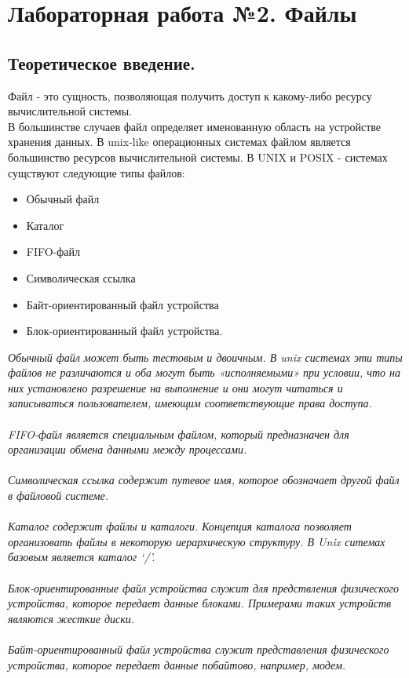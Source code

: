 \documentclass[a4paper]{article}
\begin{document}
\newpage
\section{Лабораторная работа №2. Файлы}
\subsection{\Large Теоретическое введение.}
Файл - это сущность, позволяющая получить доступ к какому-либо ресурсу вычислительной системы.\\
В большинстве случаев файл определяет именованную область на устройстве хранения данных. В unix-like операционных системах файлом является
большинство ресурсов вычислительной системы. В UNIX и POSIX - системах сущствуют следующие типы файлов:
\begin{itemize}
  \item Обычный файл
  \item Каталог
  \item FIFO-файл
  \item Символическая ссылка
  \item Байт-ориентированный файл устройства
  \item Блок-ориентированный файл устройства.
\end{itemize}
\sl Обычный файл \rm может быть тестовым и двоичным. В unix системах эти типы файлов не различаются и оба могут быть «исполняемыми» при условии, что на них установлено разрешение на выполнение и они могут читаться и записываться пользователем, имеющим соответствующие права доступа.\\\\
\sl FIFO-файл \rm является специальным файлом, который предназначен для организации обмена данными между процессами.\\\\
\sl Символическая ссылка \rm содержит путевое имя, которое обозначает другой файл в файловой системе.\\\\
\sl Каталог \rm содержит файлы и каталоги. Концепция каталога позволяет организовать файлы в некоторую иерархическую структуру. В Unix ситемах базовым является каталог ‘/’.\\\\
\sl Блок-ориентированные файл \rm устройства служит для предствления физического устройства, которое передает данные блоками. Примерами таких устройств являются жесткие диски.\\\\
\sl Байт-ориентированный файл \rm устройства служит представления физического устройства, которое передает данные побайтово, например, модем.\\\\
\end{document}

